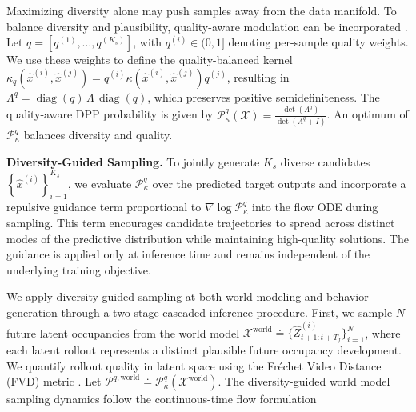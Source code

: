 \documentclass[runningheads]{llncs}
\begin{document}
Maximizing diversity alone may push samples away from the data manifold. To balance diversity and plausibility, quality-aware modulation can be incorporated \cite{morshed2025diverseflow}. Let $q =[q^{(1)}, \dots, q^{(K_s)}]$, with $q^{(i)} \in  (0, 1]$ denoting per-sample quality weights. We use these weights to define the quality-balanced kernel {$\kappa_q(\hat x^{(i)}, \hat x^{(j)})=q^{(i)} \kappa (\hat x^{(i)}, \hat x^{(j)}) q^{(j)}$}, resulting in {$
\Lambda ^{q}=\operatorname{diag}(q)\,\Lambda\, \operatorname{diag}(q)$}, which preserves positive semidefiniteness. The quality-aware DPP probability is given by $\mathcal{P}_{\kappa}^q(\mathcal X)
=
\frac{\operatorname{det}(\Lambda ^{q})}{\operatorname{det}(\Lambda ^{q}+I)}$. An optimum of $\mathcal{P}_{\kappa}^q$ balances diversity and quality.

\vspace{1.5mm}
\textbf{Diversity-Guided Sampling.} To jointly generate ${K_s}$ diverse candidates $\left\{\hat{x}^{(i)}\right\}_{i=1}^{K_s}$, we evaluate $\mathcal{P}_{\kappa}^q$ over the predicted target outputs and incorporate a repulsive guidance term proportional to $\nabla \log \mathcal{P}_{\kappa}^q$ into the flow ODE during sampling. This term encourages candidate trajectories to spread across distinct modes of the predictive distribution while maintaining high-quality solutions. The guidance is applied only at inference time and remains independent of the underlying training objective.

We apply diversity-guided sampling at both world modeling and behavior generation through a two-stage cascaded inference procedure. First, we sample $N$ future latent occupancies from the world model $\mathcal X^\text{world}\doteq \{\hat{Z}_{t+1: t+T_f}^{(i)}\}_{i=1}^N$, where each latent rollout represents a distinct plausible future occupancy development. We quantify rollout quality in latent space using the Fréchet Video Distance (FVD) metric \cite{liu2025foundationallidarworldmodels}. Let $\mathcal P^{q,\text{world}} \doteq \mathcal P_{\kappa}^q(\mathcal X^\text{world})$. The diversity-guided world model sampling dynamics follow the continuous-time flow formulation
\end{document}

